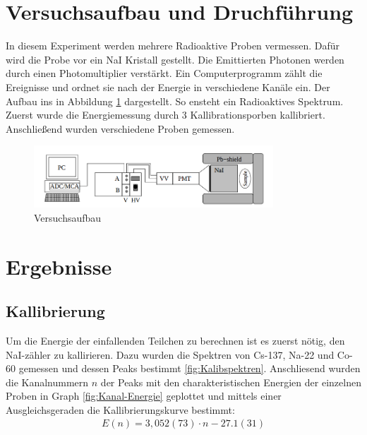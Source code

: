 \documentclass[11pt, a4paper]{article}
\begin{document}
    \section{Versuchsaufbau und Druchführung}

    In diesem Experiment werden mehrere Radioaktive Proben vermessen. Dafür wird die Probe vor ein NaI Kristall gestellt. Die Emittierten Photonen werden durch einen Photomultiplier verstärkt. Ein Computerprogramm zählt die Ereignisse und ordnet sie nach der Energie in verschiedene Kanäle ein. Der Aufbau ins in Abbildung \ref{fig:aufbau} dargestellt. So ensteht ein Radioaktives Spektrum. Zuerst wurde die Energiemessung durch 3 Kallibrationsporben kallibriert. Anschließend wurden verschiedene Proben gemessen.
    
    \begin{figure}
        \centering
        \includegraphics[width=0.8\textwidth]{Screenshot 2023-03-14 5.37.15 PM.png}
        \caption{Versuchsaufbau}
        \label{fig:aufbau}
    \end{figure}

    \section{Ergebnisse}
    \subsection{Kallibrierung}
    Um die Energie der einfallenden Teilchen zu berechnen ist es zuerst nötig, den NaI-zähler zu kallirieren. Dazu wurden die Spektren von Cs-137, Na-22 und Co-60 gemessen und dessen Peaks bestimmt \ref{fig:Kalibspektren}. 
    Anschliesend wurden die Kanalnummern $n$ der Peaks mit den charakteristischen Energien der einzelnen Proben in Graph \ref{fig:Kanal-Energie} geplottet und mittels einer Ausgleichsgeraden die Kallibrierungskurve bestimmt:
    \begin{align}
        E(n) = 3,052(73) \cdot n - 27.1(31)
    \end{align}
    
\end{document}
